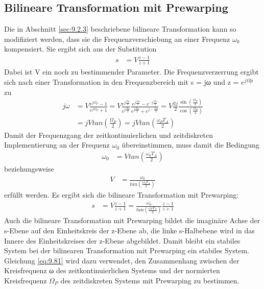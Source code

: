\subsection{Bilineare Transformation mit Prewarping}\label{sec:9.2.4}

Die in Abschnitt \ref{sec:9.2.3} beschriebene bilineare Transformation kann so modifiziert werden, dass sie die Frequenzverschiebung an einer Frequenz \(ω_{0}\) kompensiert. Sie ergibt sich aus der Substitution
\begin{align}
s &= V  \frac{z - 1}{z + 1} \label{eq:9.80}
\end{align}
Dabei ist V ein noch zu bestimmender Parameter. Die Frequenzverzerrung ergibt sich nach einer Transformation in den Frequenzbereich mit s = jω und z = \(e^{jΩp}\) zu
\begin{align}
{j \omega } &=  {V \frac{e^{j \Omega _{P} } -1}{e^{j \Omega _{P} } +1} =V \frac{e^{j \frac{\Omega _{P} }{2} } }{e^{j \frac{\Omega _{P} }{2} } }  \frac{e^{j \frac{\Omega _{P} }{2} } -e^{-j \frac{\Omega _{P} }{2} } }{e^{j \frac{\Omega _{P} }{2} } +e^{j- \frac{\Omega _{P} }{2} } } =V \frac{2 j}{2}  \frac{\sin \left(\frac{\Omega _{P} }{2} \right)}{\cos \left(\frac{\Omega _{P} }{2} \right)} } \\
{} &=  {j V tan\left(\frac{\Omega _{P} }{2} \right)=j V tan\left(\frac{\omega _{P}  T_{A} }{2} \right)}
\label{eq:9.81}
\end{align}
Damit der Frequenzgang der zeitkontinuierlichen und zeitdiskreten Implementierung an der Frequenz \(ω_{0}\) übereinstimmen, muss damit die Bedingung
\begin{align}
\omega_{0} &= V  tan\left( \frac{\omega_{0}  T_{A}}{2} \right) \label{eq:9.82}
\end{align}
beziehungsweise
\begin{align}
V &= \frac{\omega_{0}}{tan\left( \frac{\omega_{0}  T_{A}}{2} \right)} \label{eq:9.83}
\end{align}
erfüllt werden. Es ergibt sich die bilineare Transformation mit Prewarping:
\begin{align}
s &= V  \frac{z - 1}{z + 1} = \frac{\omega_{0}}{tan\left( \frac{\omega_{0}  T_{A}}{2} \right)}  \frac{z - 1}{z + 1} \label{eq:9.84}
\end{align}
Auch die bilineare Transformation mit Prewarping bildet die imaginäre Achse der s-Ebene auf den Einheitskreis der z-Ebene ab, die linke s-Halbebene wird in das Innere des Einheitskreises der z-Ebene abgebildet. Damit bleibt ein stabiles System bei der bilinearen Transformation mit Prewarping ein stabiles System. Gleichung \eqref{eq:9.81} wird dazu verwendet, den Zusammenhang zwischen der Kreisfrequenz ω des zeitkontinuierlichen Systems und der normierten Kreisfrequenz \(Ω_{P}\) des zeitdiskreten Systems mit Prewarping zu bestimmen.
